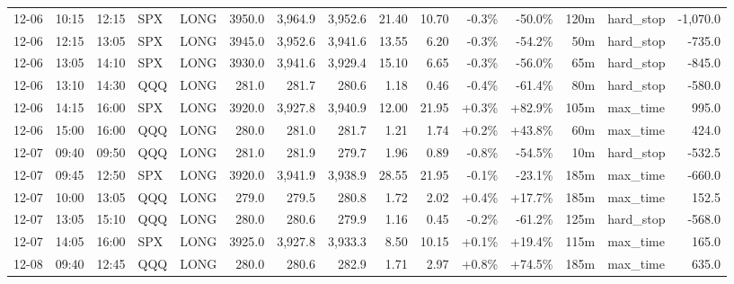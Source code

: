 \documentclass[11pt,a4paper,twoside]{article}
\begin{document}
\begin{landscape}
\begin{center}
\begin{longtable}{>{\color{txtmain}}l l l l l r r r r r r r r >{\color{txtmain}}l r}
12-06 & 10:15 & 12:15 & SPX & LONG & 3950.0 & 3,964.9 & 3,952.6 & 21.40 & 10.70 & \textcolor{lossred}{-0.3\%} & \textcolor{lossred}{-50.0\%} & 120m & hard\_stop & \textcolor{lossred}{-1,070.0} \\
12-06 & 12:15 & 13:05 & SPX & LONG & 3945.0 & 3,952.6 & 3,941.6 & 13.55 & 6.20 & \textcolor{lossred}{-0.3\%} & \textcolor{lossred}{-54.2\%} & 50m & hard\_stop & \textcolor{lossred}{-735.0} \\
12-06 & 13:05 & 14:10 & SPX & LONG & 3930.0 & 3,941.6 & 3,929.4 & 15.10 & 6.65 & \textcolor{lossred}{-0.3\%} & \textcolor{lossred}{-56.0\%} & 65m & hard\_stop & \textcolor{lossred}{-845.0} \\
12-06 & 13:10 & 14:30 & QQQ & LONG & 281.0 & 281.7 & 280.6 & 1.18 & 0.46 & \textcolor{lossred}{-0.4\%} & \textcolor{lossred}{-61.4\%} & 80m & hard\_stop & \textcolor{lossred}{-580.0} \\
12-06 & 14:15 & 16:00 & SPX & LONG & 3920.0 & 3,927.8 & 3,940.9 & 12.00 & 21.95 & \textcolor{wingreen}{+0.3\%} & \textcolor{wingreen}{+82.9\%} & 105m & max\_time & \textcolor{wingreen}{995.0} \\
12-06 & 15:00 & 16:00 & QQQ & LONG & 280.0 & 281.0 & 281.7 & 1.21 & 1.74 & \textcolor{wingreen}{+0.2\%} & \textcolor{wingreen}{+43.8\%} & 60m & max\_time & \textcolor{wingreen}{424.0} \\
12-07 & 09:40 & 09:50 & QQQ & LONG & 281.0 & 281.9 & 279.7 & 1.96 & 0.89 & \textcolor{lossred}{-0.8\%} & \textcolor{lossred}{-54.5\%} & 10m & hard\_stop & \textcolor{lossred}{-532.5} \\
12-07 & 09:45 & 12:50 & SPX & LONG & 3920.0 & 3,941.9 & 3,938.9 & 28.55 & 21.95 & \textcolor{lossred}{-0.1\%} & \textcolor{lossred}{-23.1\%} & 185m & max\_time & \textcolor{lossred}{-660.0} \\
12-07 & 10:00 & 13:05 & QQQ & LONG & 279.0 & 279.5 & 280.8 & 1.72 & 2.02 & \textcolor{wingreen}{+0.4\%} & \textcolor{wingreen}{+17.7\%} & 185m & max\_time & \textcolor{wingreen}{152.5} \\
12-07 & 13:05 & 15:10 & QQQ & LONG & 280.0 & 280.6 & 279.9 & 1.16 & 0.45 & \textcolor{lossred}{-0.2\%} & \textcolor{lossred}{-61.2\%} & 125m & hard\_stop & \textcolor{lossred}{-568.0} \\
12-07 & 14:05 & 16:00 & SPX & LONG & 3925.0 & 3,927.8 & 3,933.3 & 8.50 & 10.15 & \textcolor{wingreen}{+0.1\%} & \textcolor{wingreen}{+19.4\%} & 115m & max\_time & \textcolor{wingreen}{165.0} \\
12-08 & 09:40 & 12:45 & QQQ & LONG & 280.0 & 280.6 & 282.9 & 1.71 & 2.97 & \textcolor{wingreen}{+0.8\%} & \textcolor{wingreen}{+74.5\%} & 185m & max\_time & \textcolor{wingreen}{635.0} \\

\end{longtable}
\end{center}
\end{landscape}
\end{document}
